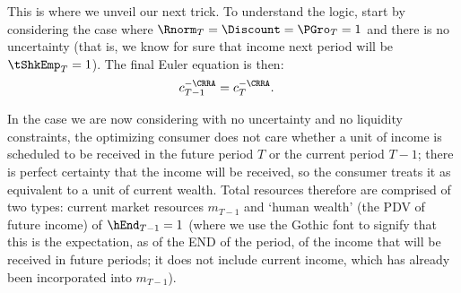 \documentclass[titlepage]{\econtex}
\begin{document}
This is where we unveil our next trick.  To understand the logic,
start by considering the case where $\Rnorm_{T} = \Discount =
\PGro_{T} = 1$ and there is no uncertainty
 (that is, we know for sure that income next period
will be $\tShkEmp_{T} = 1$).  The final Euler equation is then:
\begin{equation}\begin{gathered}\begin{aligned}
  {c}_{T-1}^{-\CRRA}  & = {c}_{T}^{-\CRRA}.
\end{aligned}\end{gathered}\end{equation}

In the case we are now considering with no uncertainty and no liquidity
constraints, the optimizing consumer does not care whether a unit of
income is scheduled to be received in the future period $T$ or the
current period $T-1$; there is perfect certainty that the income will
be received, so the consumer treats it as equivalent to a unit of
current wealth.  Total resources therefore are comprised of two types:
current market resources ${m}_{T-1}$ and `human wealth' (the PDV of
future income) of $\hEnd_{T-1}=1$ (where we use the Gothic font to
signify that this is the expectation, as of the END of the period, of
the income that will be received in future periods; it does not
include current income, which has already been incorporated into
${m}_{T-1}$).
\end{document}
